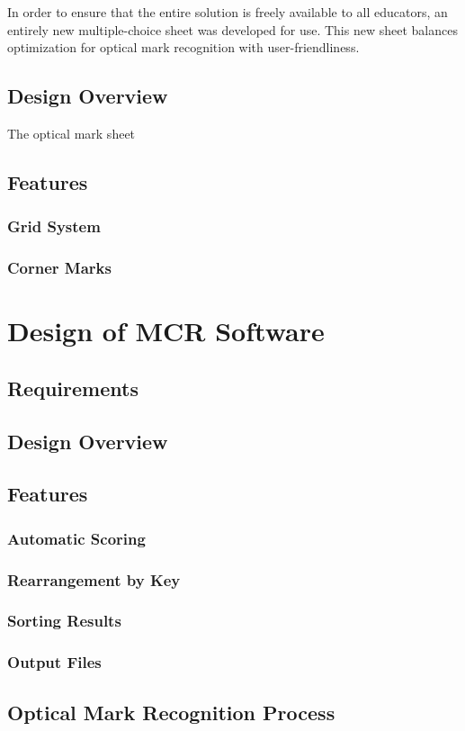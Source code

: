 \documentclass[12pt, letterpaper]{report}
\begin{document}
In order to ensure that the entire solution is freely available to all
educators, an entirely new multiple-choice sheet was developed for use.
This new sheet balances optimization for optical mark recognition with
user-friendliness.
\section{Design Overview}
The optical mark sheet
\section{Features}
\subsection{Grid System}
\subsection{Corner Marks}

\chapter{Design of MCR Software}
\section{Requirements}
\section{Design Overview}
\section{Features}
\subsection{Automatic Scoring}
\subsection{Rearrangement by Key}
\subsection{Sorting Results}
\subsection{Output Files}
\section{Optical Mark Recognition Process}
\end{document}
